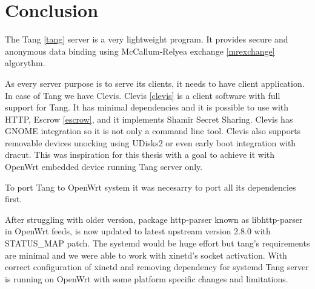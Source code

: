 \chapter{Conclusion}\label{conlusion}



The Tang \ref{tang} server is a very lightweight program.
It provides secure and anonymous data binding using McCallum-Relyea exchange \ref{mrexchange} algorythm.

As every server purpose is to serve its clients, it needs to have client application.
In case of Tang we have Clevis.
Clevis \ref{clevis} is a client software with full support for Tang.
It has minimal dependencies and it is possible to use with HTTP, Escrow \ref{escrow}, and it implements Shamir Secret Sharing.
Clevis has GNOME integration so it is not only a command line tool.
Clevis also supports removable devices unocking using UDisks2 or even early boot integration with dracut.
This was inspiration for this thesis with a goal to achieve it with OpenWrt embedded device running Tang server only.

To port Tang to OpenWrt system it was necesarry to port all its dependencies first.

After struggling with older version, package http-parser known as libhttp-parser in OpenWrt feeds, is now updated to latest upstream version 2.8.0 with STATUS\_MAP patch.
The systemd would be huge effort but tang's requirements are minimal and we were able to work with xinetd's socket activation.
With correct configuration of xinetd and removing dependency for systemd Tang server is running on OpenWrt with some platform specific changes and limitations.
